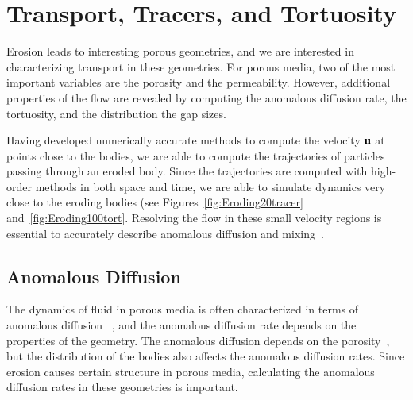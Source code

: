 \documentclass[preprint, 10pt]{elsarticle}
\begin{document}
\section{Transport, Tracers, and Tortuosity}
\label{s:transport}
Erosion leads to interesting porous geometries, and we are interested in
characterizing transport in these geometries.  For porous media, two of
the most important variables are the porosity and the permeability.
However, additional properties of the flow are revealed by computing
the anomalous diffusion rate, the tortuosity, and the distribution the
gap sizes.

Having developed numerically accurate methods to compute the velocity
${\mathbf{u}}$ at points close to the bodies, we are able to compute the
trajectories of particles passing through an eroded body.  Since the
trajectories are computed with high-order methods in both space and
time,  we are able to simulate dynamics very close to the eroding bodies
(see Figures~\ref{fig:Eroding20tracer} and~\ref{fig:Eroding100tort}.
Resolving the flow in these small velocity regions is essential to
accurately describe anomalous diffusion and
mixing~\cite{leb-den-dav-bol-car-dec-bou2011}.


\subsection{Anomalous Diffusion}
The dynamics of fluid in porous media is often characterized in terms of
anomalous diffusion~\cite{} , and the
anomalous diffusion rate depends on the properties of the geometry.  The
anomalous diffusion depends on the porosity~\cite{}, but the
distribution of the bodies also affects the anomalous diffusion rates.
Since erosion causes certain structure in porous media, calculating the
anomalous diffusion rates in these geometries is important.
\end{document}
